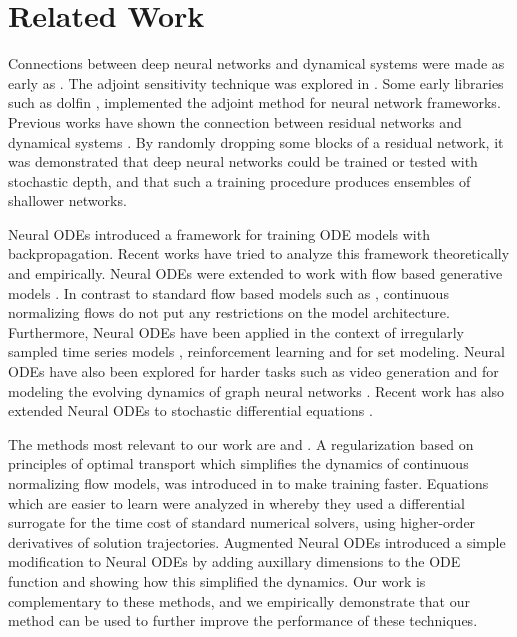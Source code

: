 \section{Related Work}
Connections between deep neural networks and dynamical systems were made as early as \cite{lagaris1998artificial}. The adjoint sensitivity technique was explored in \cite{pearlmutter1995gradient}. Some early libraries such as dolfin \cite{farrell2013automated,rackauckas2017differentialequations}, implemented the adjoint method for neural network frameworks. Previous works have shown the connection between residual networks and dynamical systems \cite{ruthotto2019deep,haber2017stable,lu2017beyond, weinan2017proposal,wang2019resnets, avelin2019neural}. By randomly dropping some blocks of a residual network, it was demonstrated that deep neural networks could be trained \cite{huang2016deep} or tested \cite{veit2016residual,ghosh2019interactive}
with stochastic depth, and that such a training procedure produces ensembles of shallower networks. 

Neural ODEs \cite{chen2018neural} introduced a framework for training ODE models with backpropagation. Recent works \cite{massaroli2020dissecting, zhang2019approximation, cuchiero2019deep, jabir2019mean, massaroli2020stable, davis2020time, hanshu2019robustness,norcliffe2020second} have tried to analyze this framework theoretically and empirically. Neural ODEs were extended to work with flow based generative models \cite{grathwohl2018ffjord}. In contrast to standard flow based models such as \cite{kingma2018glow, dinh2016density, papamakarios2017masked, papamakarios2019normalizing}, continuous normalizing flows do not put any restrictions on the model architecture. 
Furthermore, Neural ODEs have been applied in the context of irregularly sampled time series models \cite{rubanova2019latent}, reinforcement learning \cite{du2020model} and for set modeling\cite{li2020exchangeable}. Neural ODEs have also been explored for harder tasks such as video generation \cite{yildiz2019ode2vae,kanaasimple} and for modeling the evolving dynamics of graph neural networks \cite{xhonneux2019continuous}. 
Recent work has also extended Neural ODEs to stochastic differential equations \cite{li2020scalable, liu2019neural, hodgkinson2020stochastic, oganesyan2020stochasticity, wu2020stochastic, jia2019neural}.

The methods most relevant to our work are \cite{kelly2020learning, finlay2020train} and \cite{dupont2019augmented}. A regularization based on principles of optimal transport which simplifies the dynamics of continuous normalizing flow models, was introduced in \cite{finlay2020train} to make training faster. Equations which are easier to learn were analyzed in \cite{kelly2020learning} whereby they used a differential surrogate for the time cost of standard numerical solvers, using higher-order derivatives of solution trajectories.  Augmented Neural ODEs \cite{dupont2019augmented} introduced a simple modification to Neural ODEs by adding auxillary dimensions to the ODE function and showing how this simplified the dynamics. Our work is complementary to these methods, and we empirically demonstrate that our method can be used to further improve the performance of these techniques.

